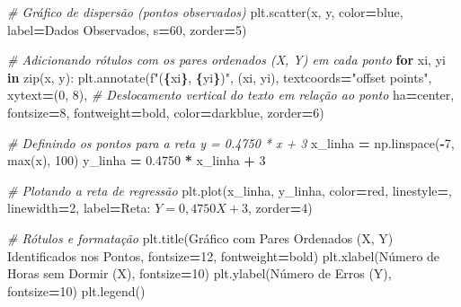 \documentclass[
]{book}
\newenvironment{Shaded}{\begin{snugshade}}{\end{snugshade}}
\newcommand{\BuiltInTok}[1]{#1}
\newcommand{\CommentTok}[1]{\textcolor[rgb]{0.56,0.35,0.01}{\textit{#1}}}
\newcommand{\ControlFlowTok}[1]{\textcolor[rgb]{0.13,0.29,0.53}{\textbf{#1}}}
\newcommand{\DecValTok}[1]{\textcolor[rgb]{0.00,0.00,0.81}{#1}}
\newcommand{\FloatTok}[1]{\textcolor[rgb]{0.00,0.00,0.81}{#1}}
\newcommand{\KeywordTok}[1]{\textcolor[rgb]{0.13,0.29,0.53}{\textbf{#1}}}
\newcommand{\NormalTok}[1]{#1}
\newcommand{\OperatorTok}[1]{\textcolor[rgb]{0.81,0.36,0.00}{\textbf{#1}}}
\newcommand{\SpecialCharTok}[1]{\textcolor[rgb]{0.81,0.36,0.00}{\textbf{#1}}}
\newcommand{\SpecialStringTok}[1]{\textcolor[rgb]{0.31,0.60,0.02}{#1}}
\newcommand{\StringTok}[1]{\textcolor[rgb]{0.31,0.60,0.02}{#1}}
\begin{document}
\begin{Shaded}
\begin{Highlighting}[]
\CommentTok{\# Gráfico de dispersão (pontos observados)}
\NormalTok{plt.scatter(x, y, color}\OperatorTok{=}\StringTok{\textquotesingle{}blue\textquotesingle{}}\NormalTok{, label}\OperatorTok{=}\StringTok{\textquotesingle{}Dados Observados\textquotesingle{}}\NormalTok{, s}\OperatorTok{=}\DecValTok{60}\NormalTok{, zorder}\OperatorTok{=}\DecValTok{5}\NormalTok{)}

\CommentTok{\# Adicionando rótulos com os pares ordenados (X, Y) em cada ponto}
\ControlFlowTok{for}\NormalTok{ xi, yi }\KeywordTok{in} \BuiltInTok{zip}\NormalTok{(x, y):}
\NormalTok{    plt.annotate(}\SpecialStringTok{f"(}\SpecialCharTok{\{}\NormalTok{xi}\SpecialCharTok{\}}\SpecialStringTok{, }\SpecialCharTok{\{}\NormalTok{yi}\SpecialCharTok{\}}\SpecialStringTok{)"}\NormalTok{,}
\NormalTok{                 (xi, yi),}
\NormalTok{                 textcoords}\OperatorTok{=}\StringTok{"offset points"}\NormalTok{,}
\NormalTok{                 xytext}\OperatorTok{=}\NormalTok{(}\DecValTok{0}\NormalTok{, }\DecValTok{8}\NormalTok{),  }\CommentTok{\# Deslocamento vertical do texto em relação ao ponto}
\NormalTok{                 ha}\OperatorTok{=}\StringTok{\textquotesingle{}center\textquotesingle{}}\NormalTok{,}
\NormalTok{                 fontsize}\OperatorTok{=}\DecValTok{8}\NormalTok{,}
\NormalTok{                 fontweight}\OperatorTok{=}\StringTok{\textquotesingle{}bold\textquotesingle{}}\NormalTok{,}
\NormalTok{                 color}\OperatorTok{=}\StringTok{\textquotesingle{}darkblue\textquotesingle{}}\NormalTok{,}
\NormalTok{                 zorder}\OperatorTok{=}\DecValTok{6}\NormalTok{)}

\CommentTok{\# Definindo os pontos para a reta y = 0.4750 * x + 3}
\NormalTok{x\_linha }\OperatorTok{=}\NormalTok{ np.linspace(}\OperatorTok{{-}}\DecValTok{7}\NormalTok{, }\BuiltInTok{max}\NormalTok{(x), }\DecValTok{100}\NormalTok{)}
\NormalTok{y\_linha }\OperatorTok{=} \FloatTok{0.4750} \OperatorTok{*}\NormalTok{ x\_linha }\OperatorTok{+} \DecValTok{3}

\CommentTok{\# Plotando a reta de regressão}
\NormalTok{plt.plot(x\_linha, y\_linha, color}\OperatorTok{=}\StringTok{\textquotesingle{}red\textquotesingle{}}\NormalTok{, linestyle}\OperatorTok{=}\StringTok{\textquotesingle{}{-}\textquotesingle{}}\NormalTok{, linewidth}\OperatorTok{=}\DecValTok{2}\NormalTok{, label}\OperatorTok{=}\StringTok{\textquotesingle{}Reta: $Y = 0,4750X + 3$\textquotesingle{}}\NormalTok{, zorder}\OperatorTok{=}\DecValTok{4}\NormalTok{)}

\CommentTok{\# Rótulos e formatação}
\NormalTok{plt.title(}\StringTok{\textquotesingle{}Gráfico com Pares Ordenados (X, Y) Identificados nos Pontos\textquotesingle{}}\NormalTok{, fontsize}\OperatorTok{=}\DecValTok{12}\NormalTok{, fontweight}\OperatorTok{=}\StringTok{\textquotesingle{}bold\textquotesingle{}}\NormalTok{)}
\NormalTok{plt.xlabel(}\StringTok{\textquotesingle{}Número de Horas sem Dormir (X)\textquotesingle{}}\NormalTok{, fontsize}\OperatorTok{=}\DecValTok{10}\NormalTok{)}
\NormalTok{plt.ylabel(}\StringTok{\textquotesingle{}Número de Erros (Y)\textquotesingle{}}\NormalTok{, fontsize}\OperatorTok{=}\DecValTok{10}\NormalTok{)}
\NormalTok{plt.legend()}


\end{Highlighting}
\end{Shaded}
\end{document}
